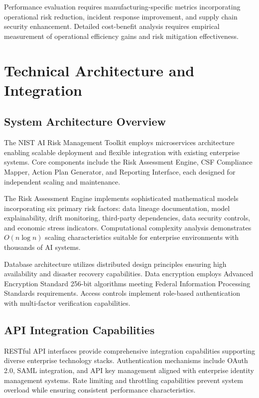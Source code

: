 \documentclass[11pt,letterpaper]{article}
\begin{document}
Performance evaluation requires manufacturing-specific metrics incorporating operational risk reduction, incident response improvement, and supply chain security enhancement. Detailed cost-benefit analysis requires empirical measurement of operational efficiency gains and risk mitigation effectiveness.

\section{Technical Architecture and Integration}

\subsection{System Architecture Overview}

The NIST AI Risk Management Toolkit employs microservices architecture enabling scalable deployment and flexible integration with existing enterprise systems. Core components include the Risk Assessment Engine, CSF Compliance Mapper, Action Plan Generator, and Reporting Interface, each designed for independent scaling and maintenance.

The Risk Assessment Engine implements sophisticated mathematical models incorporating six primary risk factors: data lineage documentation, model explainability, drift monitoring, third-party dependencies, data security controls, and economic stress indicators. Computational complexity analysis demonstrates $O(n \log n)$ scaling characteristics suitable for enterprise environments with thousands of AI systems.

Database architecture utilizes distributed design principles ensuring high availability and disaster recovery capabilities. Data encryption employs Advanced Encryption Standard 256-bit algorithms meeting Federal Information Processing Standards requirements. Access controls implement role-based authentication with multi-factor verification capabilities.

\subsection{API Integration Capabilities}

RESTful API interfaces provide comprehensive integration capabilities supporting diverse enterprise technology stacks. Authentication mechanisms include OAuth 2.0, SAML integration, and API key management aligned with enterprise identity management systems. Rate limiting and throttling capabilities prevent system overload while ensuring consistent performance characteristics.
\end{document}
